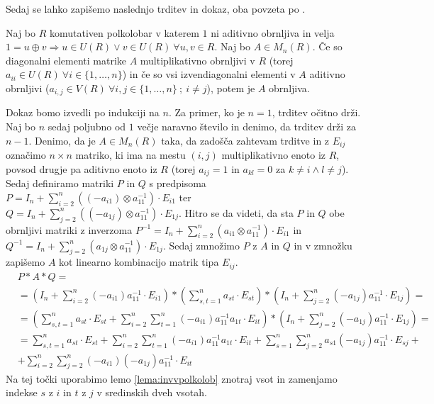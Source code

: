 \documentclass[mat1]{fmfdelo}
\begin{document}
Sedaj se lahko zapišemo naslednjo trditev in dokaz, oba povzeta po \cite{bib:Tanbase}.

\begin{trditev}\label{trd:obrnljMatr}
	Naj bo $R$ komutativen polkolobar v katerem $1$ ni aditivno obrnljiva in velja $1 = u \oplus v \Rightarrow u\in U(R) \lor v\in U(R)~\forall u, v \in R$. Naj bo $A\in M_n(R)$. Če so diagonalni elementi matrike $A$ multiplikativno obrnljivi v $R$ (torej $a_{ii}\in U(R)~\forall i \in \{1, \ldots, n\}$) in če so vsi izvendiagonalni elementi v $A$ aditivno obrnljivi ($a_{i,j}\in V(R)~\forall i, j\in \{1, \ldots, n\} ~;~i\neq j$), potem je $A$ obrnljiva.
\end{trditev}

\begin{dokaz}
	Dokaz bomo izvedli po indukciji na $n$. Za primer, ko je $n = 1$, trditev očitno drži. Naj bo $n$ sedaj poljubno od $1$ večje naravno število in denimo, da trditev drži za $n-1$. Denimo, da je $A\in M_n(R)$ taka, da zadošča zahtevam trditve in z $E_{ij}$ označimo $n\times n$ matriko, ki ima na mestu $(i, j)$ multiplikativno enoto iz $R$, povsod drugje pa aditivno enoto iz $R$ (torej $a_{ij} = 1$ in $a_{kl} = 0$ za $k\neq i \land l\neq j$). Sedaj definiramo matriki $P$ in $Q$ s predpisoma $P = I_n + \sum_{i = 2}^{n}((-a_{i1})\otimes a_{11}^{-1})\cdot E_{i1}$ ter $Q = I_n + \sum_{j = 2}^{n}((-a_{1j})\otimes a_{11}^{-1})\cdot E_{1j}$. Hitro se da videti, da sta $P$ in $Q$ obe obrnljivi matriki z inverzoma $P^{-1} = I_n + \sum_{i = 2}^{n}(a_{i1}\otimes a_{11}^{-1})\cdot E_{i1}$ in $Q^{-1} =I_n + \sum_{j = 2}^{n}(a_{1j}\otimes a_{11}^{-1})\cdot E_{1j}$. Sedaj zmnožimo $P$ z $A$ in $Q$ in v zmnožku zapišemo $A$ kot linearno kombinacijo matrik tipa $E_{ij}$.
	\begin{align*}
		& P*A*Q = \\ 
		&= \left(I_n + \sum_{i = 2}^{n}(-a_{i1}) a_{11}^{-1}\cdot E_{i1}\right)*\left(\sum_{s, t = 1}^{n}a_{st}\cdot E_{st}\right)*\left(I_n + \sum_{j = 2}^{n}(-a_{1j})a_{11}^{-1}\cdot E_{1j}\right) = \\
		&=\left(\sum_{s, t = 1}^{n}a_{st}\cdot E_{st} + \sum_{i = 2}^{n}\sum_{t = 1}^{n} (-a_{i1})a_{11}^{-1}a_{1t}\cdot E_{it}\right)*\left(I_n + \sum_{j = 2}^{n}(-a_{1j})a_{11}^{-1}\cdot E_{1j}\right) = \\
		&= \sum_{s, t = 1}^{n}a_{st}\cdot E_{st} + \sum_{i = 2}^{n}\sum_{t = 1}^{n} (-a_{i1})a_{11}^{-1}a_{1t}\cdot E_{it} + \sum_{s = 1}^{n}\sum_{j = 2}^{n} a_{s1}(-a_{1j})a_{11}^{-1}\cdot E_{sj} + \\
		&+ \sum_{i = 2}^{n}\sum_{j=2}^{n} (-a_{i1})(-a_{1j})a_{11}^{-1}\cdot E_{it}
	\end{align*}
	Na tej točki uporabimo lemo \ref{lema:invvpolkolob} znotraj vsot in zamenjamo indekse $s$ z $i$ in $t$ z $j$ v sredinskih dveh vsotah.
	

\end{dokaz}
\end{document}
